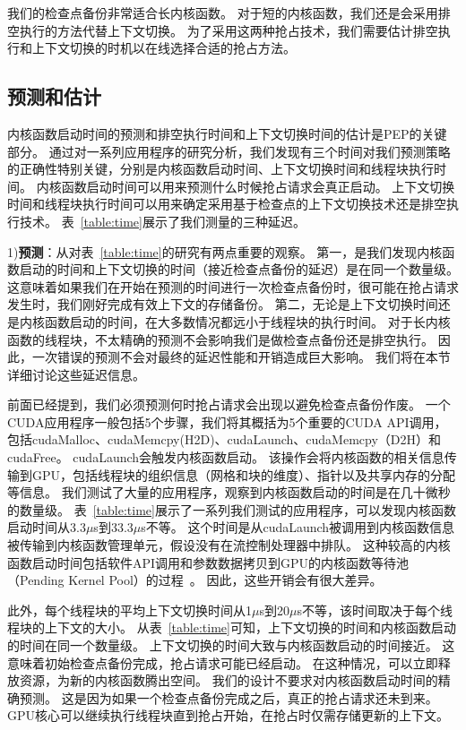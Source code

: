 我们的检查点备份非常适合长内核函数。
对于短的内核函数，我们还是会采用排空执行的方法代替上下文切换。
为了采用这两种抢占技术，我们需要估计排空执行和上下文切换的时机以在线选择合适的抢占方法。

\subsection{预测和估计}
内核函数启动时间的预测和排空执行时间和上下文切换时间的估计是PEP的关键部分。
通过对一系列应用程序的研究分析，我们发现有三个时间对我们预测策略的正确性特别关键，分别是内核函数启动时间、上下文切换时间和线程块执行时间。
内核函数启动时间可以用来预测什么时候抢占请求会真正启动。
上下文切换时间和线程块执行时间可以用来确定采用基于检查点的上下文切换技术还是排空执行技术。
表~\ref{table:time}展示了我们测量的三种延迟。

1)\textbf{预测}：从对表~\ref{table:time}的研究有两点重要的观察。
第一，是我们发现内核函数启动的时间和上下文切换的时间（接近检查点备份的延迟）是在同一个数量级。
这意味着如果我们在开始在预测的时间进行一次检查点备份时，很可能在抢占请求发生时，我们刚好完成有效上下文的存储备份。
第二，无论是上下文切换时间还是内核函数启动的时间，在大多数情况都远小于线程块的执行时间。
对于长内核函数的线程块，不太精确的预测不会影响我们是做检查点备份还是排空执行。
因此，一次错误的预测不会对最终的延迟性能和开销造成巨大影响。
我们将在本节详细讨论这些延迟信息。

前面已经提到，我们必须预测何时抢占请求会出现以避免检查点备份作废。
一个CUDA应用程序一般包括5个步骤，我们将其概括为5个重要的CUDA API调用，包括cudaMalloc、cudaMemcpy(H2D)、cudaLaunch、cudaMemcpy（D2H）和cudaFree。
cudaLaunch会触发内核函数启动。
该操作会将内核函数的相关信息传输到GPU，包括线程块的组织信息（网格和块的维度）、指针以及共享内存的分配等信息。
我们测试了大量的应用程序，观察到内核函数启动的时间是在几十微秒的数量级。
表~\ref{table:time}展示了一系列我们测试的应用程序，可以发现内核函数启动时间从3.3$\mu$s到33.3$\mu$s不等。
这个时间是从cudaLaunch被调用到内核函数信息被传输到内核函数管理单元，假设没有在流控制处理器中排队。
这种较高的内核函数启动时间包括软件API调用和参数数据拷贝到GPU的内核函数等待池（Pending Kernel Pool）的过程~。
因此，这些开销会有很大差异。

此外，每个线程块的平均上下文切换时间从1$\mu$s到20$\mu$s不等，该时间取决于每个线程块的上下文的大小。
从表~\ref{table:time}可知，上下文切换的时间和内核函数启动的时间在同一个数量级。
上下文切换的时间大致与内核函数启动的时间接近。
这意味着初始检查点备份完成，抢占请求可能已经启动。
在这种情况，可以立即释放资源，为新的内核函数腾出空间。
我们的设计不要求对内核函数启动时间的精确预测。
这是因为如果一个检查点备份完成之后，真正的抢占请求还未到来。
GPU核心可以继续执行线程块直到抢占开始，在抢占时仅需存储更新的上下文。

